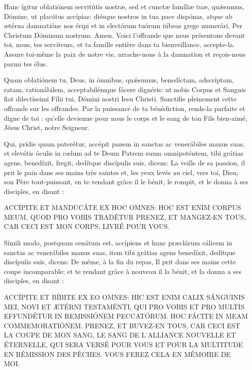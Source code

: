 \begin{paracol}{2}
\LigneParacol
{Hanc ígitur oblatiónem servitútis nostræ, sed et cunctæ famíliæ tuæ, quǽsumus, Dómine, ut placátus accípias: diésque nostros in tua pace dispónas, atque ab ætérna damnatióne nos éripi et in electórum tuórum iúbeas grege numerári. Per Christum Dóminum nostrum. Amen.}
{Voici l'offrande que nous présentons devant toi, nous, tes serviteurs, et ta famille entière dans ta bienveillance, accepte-la. Assure toi-même la paix de notre vie, arrache-nous à la damnation et reçois-nous parmi tes élus.}

\LigneParacol
{Quam oblatiónem tu, Deus, in ómnibus, quǽsumus, benedíctam, adscríptam, ratam, rationábilem, acceptabilémque fácere dignéris: ut nobis Corpus et Sanguis fiat dilectíssimi Fílii tui, Dómini nostri Iesu Christi.}
{Sanctifie pleinement cette offrande sur les offrandes. Par la puissance de ta bénédiction, rends-la parfaite et digne de toi : qu'elle devienne pour nous le corps et le sang de ton Fils bien-aimé, Jésus Christ, notre Seigneur.}

\LigneParacol
{Qui, prídie quam paterétur, accépit panem in sanctas ac venerábiles manus suas, et elevátis óculis in cælum ad te Deum Patrem suum omnipoténtem, tibi grátias agens, benedíxit, fregit, dedítque discípulis suis, dicens:}
{La veille de sa passion, il prit le pain dans ses mains très saintes et, les yeux levés au ciel, vers toi, Dieu, son Père tout-puissant, en te rendant grâce il le bénit, le rompit, et le donna à ses disciples, en disant :}

\LigneParacol
{ACCÍPITE ET MANDUCÁTE EX HOC OMNES: HOC EST ENIM CORPUS MEUM, QUOD PRO VOBIS TRADÉTUR}
{PRENEZ, ET MANGEZ-EN TOUS, CAR CECI EST MON CORPS, LIVRÉ POUR VOUS.}

\LigneParacol
{Símili modo, postquam cenátum est, accípiens et hunc præclárum cálicem in sanctas ac venerábiles manus suas, item tibi grátias agens benedíxit, dedítque discípulis suis, dicens:}
{De même, à la fin du repas, Il prit dans ses mains cette coupe incomparable; et te rendant grâce à nouveau il la bénit, et la donna a ses disciples, en disant :}

\LigneParacol
{ACCÍPITE ET BÍBITE EX EO OMNES: HIC EST ENIM CALIX SÁNGUINIS MEI, NOVI ET ÆTÉRNI TESTAMÉNTI, QUI PRO VOBIS ET PRO MULTIS EFFUNDÉTUR IN REMISSIÓNEM PECCATÓRUM. HOC FÁCITE IN MEAM COMMEMORATIÓNEM.}
{PRENEZ, ET BUVEZ-EN TOUS, CAR CECI EST LA COUPE DE MON SANG, LE SANG DE L'ALLIANCE NOUVELLE ET ÉTERNELLE, QUI SERA VERSÉ POUR VOUS ET POUR LA MULTITUDE EN RÉMISSION DES PÊCHES. VOUS FEREZ CELA EN MÉMOIRE DE MOI.}


\end{paracol}
